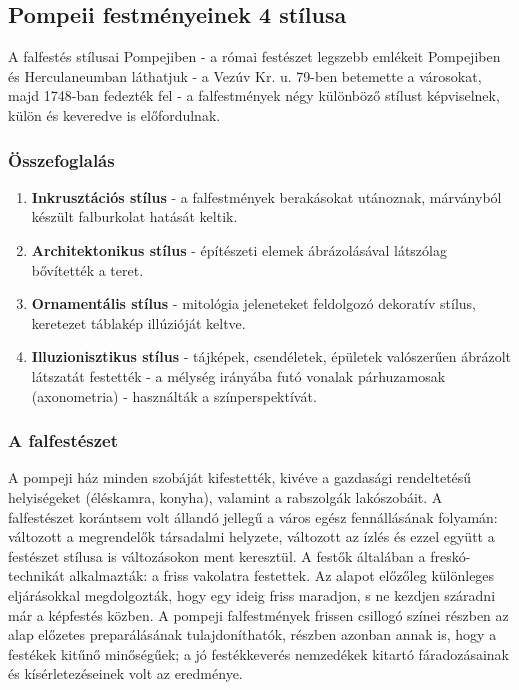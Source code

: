 \subsection*{Pompeii festményeinek 4 stílusa}

A falfestés stílusai Pompejiben - a római festészet legszebb emlékeit Pompejiben és
Herculaneumban láthatjuk - a Vezúv Kr. u. 79-ben betemette a városokat, majd 1748-ban
fedezték fel - a falfestmények négy különböző stílust képviselnek, külön és keveredve is
előfordulnak.

\subsubsection{Összefoglalás}

\begin{enumerate}
	\item  \textbf{Inkrusztációs stílus} - a falfestmények berakásokat utánoznak, márványból készült
	falburkolat hatását keltik.
	
	\item  \textbf{Architektonikus stílus} - építészeti elemek ábrázolásával látszólag bővítették a teret. 
	
	\item \textbf{ Ornamentális stílus} - mitológia jeleneteket feldolgozó dekoratív stílus, keretezet
	táblakép illúzióját keltve.
	
	\item\textbf{ Illuzionisztikus stílus} - tájképek, csendéletek, épületek valószerűen ábrázolt látszatát
	festették - a mélység irányába futó vonalak párhuzamosak (axonometria) - használták a
	színperspektívát.
\end{enumerate} 



\subsubsection{A falfestészet}

A pompeji ház minden szobáját kifestették, kivéve a gazdasági rendeltetésű helyiségeket
(éléskamra, konyha), valamint a rabszolgák lakószobáit. A falfestészet korántsem volt
állandó jellegű a város egész fennállásának folyamán: változott a megrendelők társadalmi
helyzete, változott az ízlés és ezzel együtt a festészet stílusa is változásokon ment
keresztül. A festők általában a freskó-technikát alkalmazták: a friss vakolatra festettek.
Az alapot előzőleg különleges eljárásokkal megdolgozták, hogy egy ideig friss maradjon,
s ne kezdjen száradni már a képfestés közben. A pompeji falfestmények frissen csillogó
színei részben az alap előzetes preparálásának tulajdoníthatók, részben azonban annak is,
hogy a festékek kitűnő minőségűek; a jó festékkeverés nemzedékek kitartó
fáradozásainak és kísérletezéseinek volt az eredménye.


